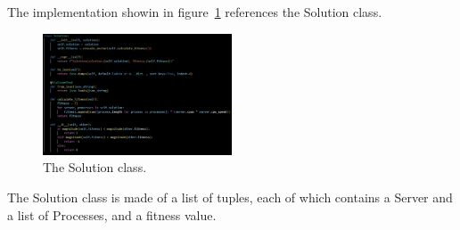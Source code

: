 The implementation showin in figure~\ref{fig:solution} references the Solution class.

\begin{figure}[h]
    \centering
    \includegraphics[width=0.5\textwidth]{./Resources/Code_Snippets/Solution_Class.png}
    \caption{The Solution class.}
    \label{fig:solution}
\end{figure}

The Solution class is made of a list of tuples, each of which contains a Server and a list of Processes, and a fitness value.